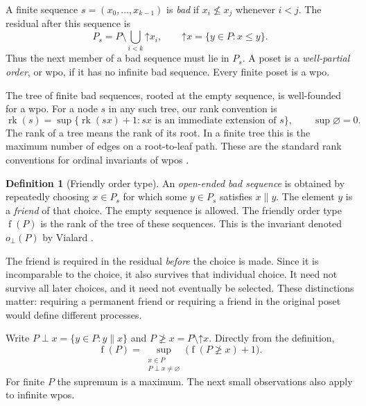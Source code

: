 \documentclass[11pt,letterpaper]{article}
\theoremstyle{definition}
\newtheorem{definition}[definition]{Definition}
\theoremstyle{remark}
\newcommand{\fot}{\operatorname{f}}
\newcommand{\rk}{\operatorname{rk}}
\begin{document}
A finite sequence $s=(x_0,\ldots,x_{k-1})$ is \emph{bad} if
$x_i\not\leq x_j$ whenever $i<j$. The residual after this sequence is
\[
 P_s=P\setminus\bigcup_{i<k}\mathord\uparrow x_i,
 \qquad \mathord\uparrow x=\{y\in P:x\leq y\}.
\]
Thus the next member of a bad sequence must lie in $P_s$. A poset is a
\emph{well-partial order}, or wpo, if it has no infinite bad sequence.
Every finite poset is a wpo.

The tree of finite bad sequences, rooted at the empty sequence, is
well-founded for a wpo. For a node $s$ in any such tree, our rank convention is
\begin{equation}\label{eq:tree-rank}
 \rk(s)=\sup\{\rk(sx)+1:sx\text{ is an immediate extension of }s\},
 \qquad \sup\varnothing=0.
\end{equation}
The rank of a tree means the rank of its root. In a finite tree this is the
maximum number of edges on a root-to-leaf path. These are the standard
rank conventions for ordinal invariants of wpos \cite{DSS}.

\begin{definition}[Friendly order type]
An \emph{open-ended bad sequence} is obtained by repeatedly choosing
$x\in P_s$ for which some $y\in P_s$ satisfies $x\parallel y$.
The element $y$ is a \emph{friend} of that choice. The empty sequence is
allowed. The friendly order type $\fot(P)$ is the rank of the tree of these
sequences. This is the invariant denoted $o_\perp(P)$ by Vialard
\cite[Definition~3.3]{VialardMFCS}.
\end{definition}

The friend is required in the residual \emph{before} the choice is made.
Since it is incomparable to the choice, it also survives that individual
choice. It need not survive all later choices, and it need not eventually
be selected. These distinctions matter: requiring a permanent friend or
requiring a friend in the original poset would define different processes.

Write $P\perp x=\{y\in P:y\parallel x\}$ and
$P\not\geq x=P\setminus\mathord\uparrow x$. Directly from the definition,
\begin{equation}\label{eq:residual}
 \fot(P)=\sup_{\substack{x\in P\\P\perp x\ne\varnothing}}
 \bigl(\fot(P\not\geq x)+1\bigr).
\end{equation}
For finite $P$ the supremum is a maximum. The next small observations also
apply to infinite wpos.
\end{document}
